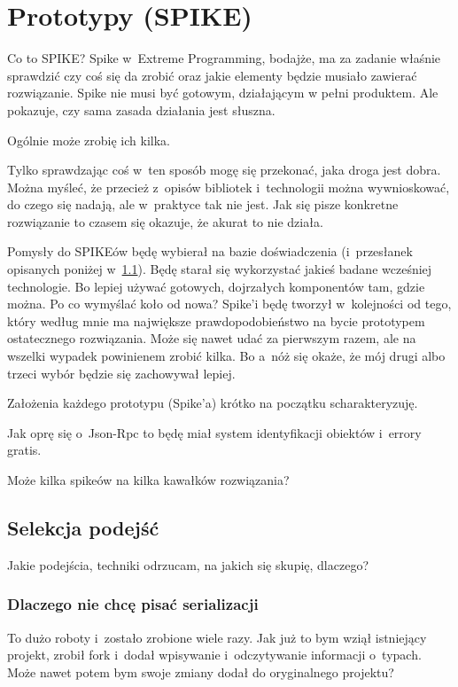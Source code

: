\section{Prototypy (SPIKE)}
Co to SPIKE? Spike w~Extreme Programming, bodajże, ma za zadanie właśnie sprawdzić czy coś się da zrobić oraz jakie elementy będzie musiało zawierać rozwiązanie.
Spike nie musi być gotowym, działającym w pełni produktem. Ale pokazuje, czy sama zasada działania jest słuszna.

Ogólnie może zrobię ich kilka.

Tylko sprawdzając coś w~ten sposób mogę się przekonać, jaka droga jest dobra. Można myśleć, że przecież z~opisów bibliotek i~technologii można wywnioskować, do czego się nadają, ale w~praktyce tak nie jest. Jak się pisze konkretne rozwiązanie to czasem się okazuje, że akurat to nie działa.

Pomysły do SPIKEów będę wybierał na bazie doświadczenia (i~przesłanek opisanych poniżej w~\ref{approach-selection}).
Będę starał się wykorzystać jakieś badane wcześniej technologie. Bo lepiej używać gotowych, dojrzałych komponentów tam, gdzie można. Po co wymyślać koło od nowa?
Spike'i będę tworzył w~kolejności od tego, który według mnie ma największe prawdopodobieństwo na bycie prototypem ostatecznego rozwiązania.
Może się nawet udać za pierwszym razem, ale na wszelki wypadek powinienem zrobić kilka. Bo a~nóż się okaże, że mój drugi albo trzeci wybór będzie się zachowywał lepiej.

Założenia każdego prototypu (Spike'a) krótko na początku scharakteryzuję.

Jak oprę się o~Json-Rpc to będę miał system identyfikacji obiektów i~errory gratis.

Może kilka spikeów na kilka kawałków rozwiązania?

\subsection{Selekcja podejść}
\label{approach-selection}
Jakie podejścia, techniki odrzucam, na jakich się skupię, dlaczego?

\subsubsection{Dlaczego nie chcę pisać serializacji}
To dużo roboty i~zostało zrobione wiele razy. Jak już to bym wziął istniejący projekt, zrobił fork i~dodał wpisywanie i~odczytywanie informacji o~typach. Może nawet potem bym swoje zmiany dodał do oryginalnego projektu?

